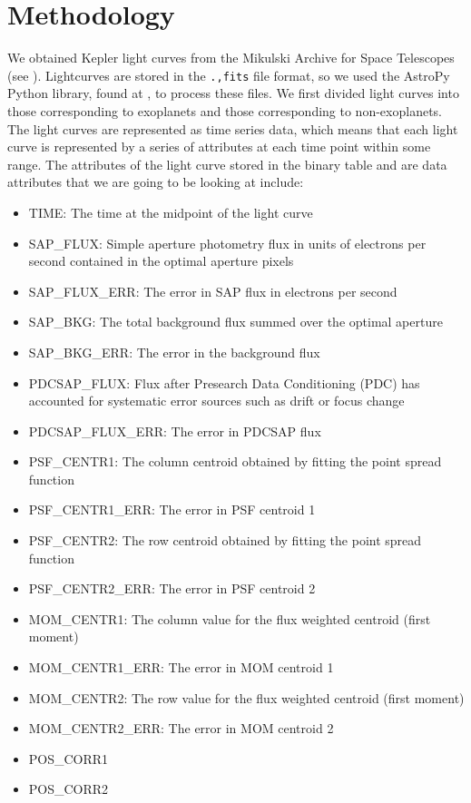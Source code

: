 \documentclass{amsart}
\begin{document}
\section{Methodology}
We obtained Kepler light curves from the Mikulski Archive for Space Telescopes (see \cite{mast}). Lightcurves are stored in the \texttt{.,fits} file format, so we used the AstroPy Python library, found at \cite{AstroPy}, to process these files. We first divided light curves into those corresponding to exoplanets and those corresponding to non-exoplanets. The light curves are represented as time series data, which means that each light curve is represented by a series of attributes at each time point within some range. The attributes of the light curve stored in the binary table and are data attributes that we are going to be looking at include:
\begin{itemize}
	\item TIME: The time at the midpoint of the light curve
	\item SAP\_FLUX: Simple aperture photometry flux in units of electrons per second contained in the optimal aperture pixels
	\item SAP\_FLUX\_ERR: The error in SAP flux in electrons per second
	\item SAP\_BKG: The total background flux summed over the optimal aperture
	\item SAP\_BKG\_ERR: The error in the background flux
	\item PDCSAP\_FLUX: Flux after Presearch Data Conditioning (PDC) has accounted for systematic error sources such as drift or focus change
	\item PDCSAP\_FLUX\_ERR: The error in PDCSAP flux
	\item PSF\_CENTR1: The column centroid obtained by fitting the point spread function
	\item PSF\_CENTR1\_ERR: The error in PSF centroid 1
	\item PSF\_CENTR2: The row centroid obtained by fitting the point spread function
	\item PSF\_CENTR2\_ERR: The error in PSF centroid 2
	\item MOM\_CENTR1: The column value for the flux weighted centroid (first moment)
	\item MOM\_CENTR1\_ERR: The error in MOM centroid 1
	\item MOM\_CENTR2: The row value for the flux weighted centroid (first moment)
	\item MOM\_CENTR2\_ERR: The error in MOM centroid 2
	\item POS\_CORR1
	\item POS\_CORR2
\end{itemize}
\end{document}
